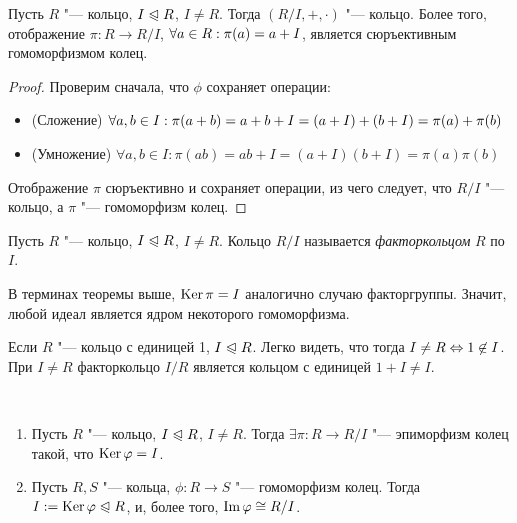 \begin{theorem}
	Пусть $R$ "--- кольцо, $I \trianglelefteqslant R$, $I \ne R$. Тогда $(R / I, +, \cdot)$ "--- кольцо. Более того, отображение $\pi: R \to R/I$, $\forall a \in R: \pi(a) \hm= a + I$, является сюръективным гомоморфизмом колец.
\end{theorem}

\begin{proof}
	Проверим сначала, что $\phi$ сохраняет операции:
	\begin{itemize}
		\item (Сложение) $\forall a, b \in I: \pi(a + b) = a + b + I = (a + I) + (b + I) \hm= \pi(a) + \pi(b)$
		\item (Умножение) $\forall a, b \in I: \pi(ab) = ab + I = (a + I)(b + I) = \pi(a)\pi(b)$
	\end{itemize}

	Отображение $\pi$ сюръективно и сохраняет операции, из чего следует, что $R / I$ "--- кольцо, а $\pi$ "--- гомоморфизм колец.
\end{proof}

\begin{definition}
	Пусть $R$ "--- кольцо, $I \trianglelefteqslant R$, $I \ne R$. Кольцо $R / I$ называется \textit{факторкольцом} $R$ по $I$.
\end{definition}

\begin{note}
	В терминах теоремы выше, $\operatorname{Ker}\pi = I$ аналогично случаю факторгруппы. Значит, любой идеал является ядром некоторого гомоморфизма.
\end{note}

\begin{note}
	Если $R$ "--- кольцо с единицей 1, $I \trianglelefteqslant R$. Легко видеть, что тогда $I \ne R \hm\lra 1 \not\in I$. При $I \ne R$ факторкольцо $I / R$ является кольцом с единицей $1 + I \ne I$.
\end{note}

\begin{theorem}~
	\begin{enumerate}
		\item Пусть $R$ "--- кольцо, $I \trianglelefteqslant R$, $I \ne R$. Тогда $\exists \pi: R \to R / I$ "--- эпиморфизм колец такой, что $\ke\phi \hm= I$.
		\item Пусть $R, S$ "--- кольца, $\phi: R \to S$ "--- гомоморфизм колец. Тогда $I \hm{:=} \ke\phi \normal R$, и, более того, $\operatorname{Im}\varphi \cong R / I$.
	\end{enumerate}
\end{theorem}

